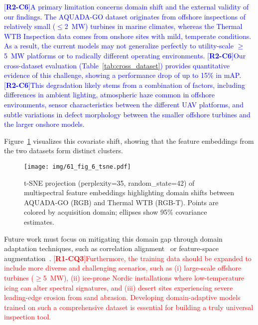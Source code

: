 \documentclass[energies,article,submit,pdftex,moreauthors]{Definitions/mdpi}
\newcommand{\revtag}[2]{[\textbf{R#1-C#2}]}
\newcommand{\Rone}[1]{\textcolor{red}{#1}}
\newcommand{\Rtwo}[1]{\textcolor{blue}{#1}}
\begin{document}
\Rtwo{\revtag{2}{6}A primary limitation concerns domain shift and the external validity of our findings. The AQUADA-GO dataset originates from offshore inspections of relatively small (\(\leq\)\SI{2}{\mega\watt}) turbines in marine climates, whereas the Thermal WTB Inspection data comes from onshore sites with mild, temperate conditions. As a result, the current models may not generalize perfectly to utility-scale \(\geq\)\SI{5}{\mega\watt} platforms or to radically different operating environments.} \Rtwo{\revtag{2}{6}Our cross-dataset evaluation (Table~\ref{tab:cross_dataset}) provides quantitative evidence of this challenge, showing a performance drop of up to 15\% in mAP.} \Rtwo{\revtag{2}{6}This degradation likely stems from a combination of factors, including differences in ambient lighting, atmospheric haze common in offshore environments, sensor characteristics between the different UAV platforms, and subtle variations in defect morphology between the smaller offshore turbines and the larger onshore models.}

Figure~\ref{fig:domain_shift_tsne} visualizes this covariate shift, showing that the feature embeddings from the two datasets form distinct clusters.

\begin{figure}[!htb]
\centering
\texttt{[image: img/61\_fig\_6\_tsne.pdf]}
\caption{t\mbox{-}SNE projection (perplexity=35, random\_state=42) of multispectral feature embeddings highlighting domain shifts between AQUADA\mbox{-}GO (RGB) and Thermal WTB (RGB\mbox{-}T). Points are colored by acquisition domain; ellipses show 95\% covariance estimates.}
\label{fig:domain_shift_tsne}
\end{figure}

Future work must focus on mitigating this domain gap through domain adaptation techniques, such as correlation alignment~\cite{Sun2016Deep} or feature-space augmentation~\cite{Zhou2023MixStyle}. \Rone{\revtag{1}{Q3}Furthermore, the training data should be expanded to include more diverse and challenging scenarios, such as (i) large-scale offshore turbines (\(\geq\)5~MW), (ii) ice-prone Nordic installations where low-temperature icing can alter spectral signatures, and (iii) desert sites experiencing severe leading-edge erosion from sand abrasion. Developing domain-adaptive models trained on such a comprehensive dataset is essential for building a truly universal inspection tool.}
\end{document}
